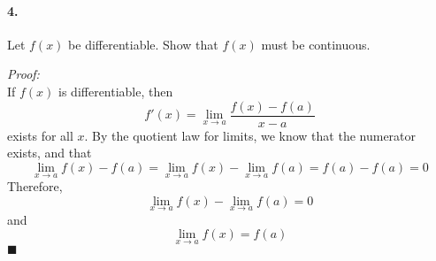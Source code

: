\documentclass[10pt,a4paper]{article}
\begin{document}
\paragraph{4.} Let $f(x)$ be differentiable. Show that $f(x)$ must be continuous.
\begin{flushleft}
\textit{Proof:}\\
If $f(x)$ is differentiable, then
$$ f'(x) = \lim_{x \to a} \frac{f(x)-f(a)}{x-a}$$
exists for all $x$. By the quotient law for limits, we know that the numerator exists, and that
$$ \lim_{x \to a} f(x) -f(a) = \lim_{x \to a} f(x) - \lim_{x \to a}f(a) = f(a)-f(a) = 0$$
Therefore, 
$$ \lim_{x \to a} f(x) - \lim_{x \to a}f(a) = 0$$
and
$$ \lim_{x \to a} f(x) = f(a)$$
$\blacksquare$
\end{flushleft}
\end{document}
